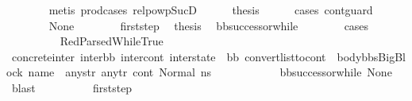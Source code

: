 \begin{isabellebody}
\ \ \ \ \ \ \isamarkupfalse%
\ {\isacharparenleft}{\kern0pt}metis\ prod{\isacharunderscore}{\kern0pt}cases{}\ relpowp{\isacharunderscore}{\kern0pt}Suc{\isacharunderscore}{\kern0pt}D{}{\isacharparenright}{\kern0pt}\isanewline
\isanewline
\ \ \ \ \isamarkupfalse%
\ {\isacharquery}{\kern0pt}thesis\isanewline
\ \ \ \ \isamarkupfalse%
\ {\isacharparenleft}{\kern0pt}cases\ cont{\isacharunderscore}{\kern0pt}guard{\isacharparenright}{\kern0pt}\isanewline
\ \ \ \ \ \ \isamarkupfalse%
\ None\isanewline
\ \ \ \ \ \ \isamarkupfalse%
\ first{\isacharunderscore}{\kern0pt}step\ \isamarkupfalse%
\ {\isacharquery}{\kern0pt}thesis\ \isamarkupfalse%
\ bb{\isacharunderscore}{\kern0pt}successor{\isacharunderscore}{\kern0pt}while\isanewline
\ \ \ \ \ \ \isamarkupfalse%
\ cases\isanewline
\ \ \ \ \ \ \ \ \isamarkupfalse%
\ RedParsedWhileTrue\isanewline
\ \ \ \ \ \ \ \ \isamarkupfalse%
\ concrete{\isacharunderscore}{\kern0pt}inter{}{\isacharcolon}{\kern0pt}\ {\isachardoublequoteopen}{\isacharparenleft}{\kern0pt}inter{\isacharunderscore}{\kern0pt}bb{\isacharcomma}{\kern0pt}\ inter{\isacharunderscore}{\kern0pt}cont{\isacharcomma}{\kern0pt}\ inter{\isacharunderscore}{\kern0pt}state{\isacharparenright}{\kern0pt}\ {\isacharequal}{\kern0pt}\ {\isacharparenleft}{\kern0pt}bb{}{\isacharcomma}{\kern0pt}\ convert{\isacharunderscore}{\kern0pt}list{\isacharunderscore}{\kern0pt}to{\isacharunderscore}{\kern0pt}cont\ {\isacharparenleft}{\kern0pt}{\isacharparenleft}{\kern0pt}\ body{\isacharunderscore}{\kern0pt}bbs{\isacharparenright}{\kern0pt}{\isacharat}{\kern0pt}{\isacharbrackleft}{\kern0pt}{\isacharparenleft}{\kern0pt}BigBlock\ name\ {\isacharbrackleft}{\kern0pt}{\isacharbrackright}{\kern0pt}\ any{\isacharunderscore}{\kern0pt}str\ any{\isacharunderscore}{\kern0pt}tr{\isacharparenright}{\kern0pt}{\isacharbrackright}{\kern0pt}{\isacharparenright}{\kern0pt}\ cont{}{\isacharcomma}{\kern0pt}\ {\isacharparenleft}{\kern0pt}Normal\ ns{}{\isacharparenright}{\kern0pt}{\isacharparenright}{\kern0pt}{\isachardoublequoteclose}\isanewline
\ \ \ \ \ \ \ \ \ \ \isamarkupfalse%
\ bb{\isacharunderscore}{\kern0pt}successor{\isacharunderscore}{\kern0pt}while\ None\ \isamarkupfalse%
\ blast\isanewline
\isanewline
\ \ \ \ \ \ \ \ \isamarkupfalse%
\ first{\isacharunderscore}{\kern0pt}step\isanewline

\end{isabellebody}
